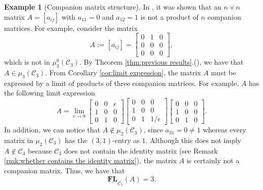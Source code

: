 \documentclass[reqno]{amsart}
\theoremstyle{definition}
\newtheorem{example}[theorem]{Example}
\numberwithin{equation}{section}
\begin{document}
\begin{example}[Companion matrix structure]
    In \cite[Section 6.1]{ye2017new}, it was shown that an $n \times n$ matrix $A=[a_{ij}]$ with $a_{11}=0 $ and $a_{12}=1$ is not a product of $n$ companion matrices. For example, consider the matrix
    \begin{equation*}
        A:=[a_{ij}]=\begin{bmatrix}
            0 & 1 & 0\\
            0 & 0 & 0\\
            0 & 0 & 0
        \end{bmatrix},
    \end{equation*}
    which is not in $\mu_3^0(\mathcal{C}_3)$. By Theorem \ref{thm:previous results}.(), we have that $A \in \mu_3(\mathcal{C}_3)$. From Corollary \ref{cor:limit expression}, the matrix $A$ must be expressed by a limit of products of three companion matrices. For example, $A$ has the following limit expression
    \begin{equation*}
        A=\lim_{\epsilon \rightarrow 0}\begin{bmatrix}
            0 & 0 & \epsilon\\
            1 & 0 & 0\\
            0 & 1 & 0
        \end{bmatrix}\begin{bmatrix}
            0 & 0 & 0\\
            1 & 0 & 0\\
            0 & 1 &1/\epsilon
        \end{bmatrix}\begin{bmatrix}
            0 & 0 & 0\\
            1 & 0 & 0\\
            0 & 1 & 0
        \end{bmatrix}.
    \end{equation*}
    In addition, we can notice that $A \notin \mu_2(\mathcal{C}_3)$, since $a_{31}=0 \neq 1$ whereas every matrix in $\mu_2(\mathcal{C}_3)$ has the $(3,1)$-entry as $1$. Although this does not imply $A \notin \mathcal{C}_3$ because $\mathcal{C}_3$ does not contain the identity matrix (see Remark \ref{rmk:whether contains the identity matrix}), the matrix $A$ is certainly not a companion matrix. Thus, we have that
    \begin{equation*}
        \underline{\mathbf{FL}}_{\mathcal{C}_3}(A)=3.
    \end{equation*}
\end{example}
\end{document}
